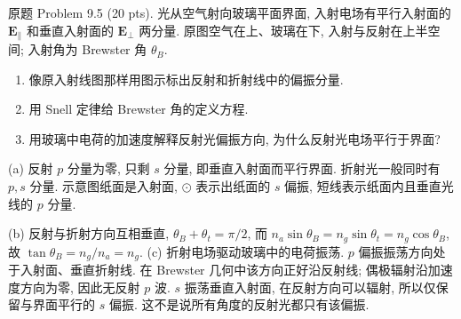 \begin{exercise}\label{ps:9.5}
原题 Problem 9.5 (20 pts). 光从空气射向玻璃平面界面, 入射电场有平行入射面的 $\mathbf E_\parallel$ 和垂直入射面的 $\mathbf E_\perp$ 两分量. 原图空气在上、玻璃在下, 入射与反射在上半空间; 入射角为 Brewster 角 $\theta_B$.
\begin{enumerate}[label=\alph*.]
\item 像原入射线图那样用图示标出反射和折射线中的偏振分量.
\item 用 Snell 定律给 Brewster 角的定义方程.
\item 用玻璃中电荷的加速度解释反射光偏振方向, 为什么反射光电场平行于界面?
\end{enumerate}
\end{exercise}
\begin{solution}
(a) 反射 $p$ 分量为零, 只剩 $s$ 分量, 即垂直入射面而平行界面. 折射光一般同时有 $p,s$ 分量. 示意图纸面是入射面, $\odot$ 表示出纸面的 $s$ 偏振, 短线表示纸面内且垂直光线的 $p$ 分量.
\begin{center}\end{center}
(b) 反射与折射方向互相垂直, $\theta_B+\theta_t=\pi/2$, 而 $n_a\sin\theta_B=n_g\sin\theta_t=n_g\cos\theta_B$, 故 $\tan\theta_B=n_g/n_a=n_g$.
(c) 折射电场驱动玻璃中的电荷振荡. $p$ 偏振振荡方向处于入射面、垂直折射线. 在 Brewster 几何中该方向正好沿反射线; 偶极辐射沿加速度方向为零, 因此无反射 $p$ 波. $s$ 振荡垂直入射面, 在反射方向可以辐射, 所以仅保留与界面平行的 $s$ 偏振. 这不是说所有角度的反射光都只有该偏振.
\end{solution}


